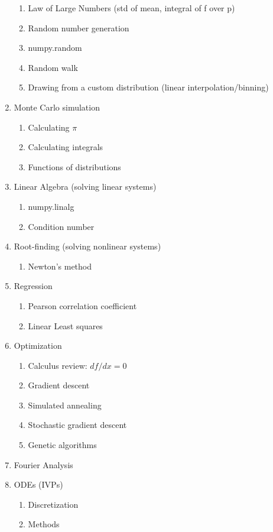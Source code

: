 \documentclass{article}
\begin{document}
\begin{multicols}{2}
\begin{enumerate}
\begin{enumerate}
		\item Law of Large Numbers (std of mean, integral of f over p)
		\item Random number generation
		\item numpy.random
		\item Random walk
		\item Drawing from a custom distribution (linear interpolation/binning)
	\end{enumerate}
	\item Monte Carlo simulation
	\begin{enumerate}
		\item Calculating $\pi$
		\item Calculating integrals
		\item Functions of distributions
	\end{enumerate}
	\item Linear Algebra (solving linear systems)
	\begin{enumerate}
		\item numpy.linalg
		\item Condition number
	\end{enumerate}
	\item Root-finding (solving nonlinear systems)
	\begin{enumerate}
		\item Newton's method
	\end{enumerate}
	\item Regression
	\begin{enumerate}
		\item Pearson correlation coefficient
		\item Linear Least squares
	\end{enumerate}
	\item Optimization
	\begin{enumerate}
		\item Calculus review: $df/dx=0$
		\item Gradient descent
		\item Simulated annealing
		\item Stochastic gradient descent
		\item Genetic algorithms
	\end{enumerate}
	\item Fourier Analysis
	\item ODEs (IVPs)
	\begin{enumerate}
		\item Discretization
		\item Methods

\end{enumerate}
\end{enumerate}
\end{multicols}
\end{document}
